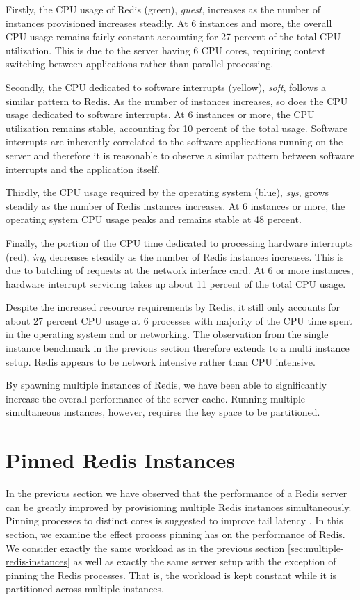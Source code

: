 Firstly, the CPU usage of Redis (green), \textit{guest}, increases as the number of instances provisioned increases steadily. At 6 instances and more, the overall CPU usage remains fairly constant accounting for 27 percent of the total CPU utilization. This is due to the server having 6 CPU cores, requiring context switching between applications rather than parallel processing.

Secondly, the CPU dedicated to software interrupts (yellow), \textit{soft}, follows a similar pattern to Redis. As the number of instances increases, so does the CPU usage dedicated to software interrupts. At 6 instances or more, the CPU utilization remains stable, accounting for 10 percent of the total usage. Software interrupts are inherently correlated to the software applications running on the server and therefore it is reasonable to observe a similar pattern between software interrupts and the application itself.

Thirdly, the CPU usage required by the operating system (blue), \textit{sys}, grows steadily as the number of Redis instances increases. At 6 instances or more, the operating system CPU usage peaks and remains stable at 48 percent.

Finally, the portion of the CPU time dedicated to processing hardware interrupts (red), \textit{irq}, decreases steadily as the number of Redis instances increases. This is due to batching of requests at the network interface card. At 6 or more instances, hardware interrupt servicing takes up about 11 percent of the total CPU usage.

Despite the increased resource requirements by Redis, it still only accounts for about 27 percent CPU usage at 6 processes with majority of the CPU time spent in the operating system and or networking. The observation from the single instance benchmark in the previous section therefore extends to a multi instance setup. Redis appears to be network intensive rather than CPU intensive.


By spawning multiple instances of Redis, we have been able to significantly increase the overall performance of the server cache. Running multiple simultaneous instances, however, requires the key space to be partitioned.


\section{Pinned Redis Instances}

In the previous section we have observed that the performance of a Redis server can be greatly improved by provisioning multiple Redis instances simultaneously. Pinning processes to distinct cores is suggested to improve tail latency \cite{leverich2014reconciling}. In this section, we examine the effect process pinning has on the performance of Redis. We consider exactly the same workload as in the previous section \ref{sec:multiple-redis-instances} as well as exactly the same server setup with the exception of pinning the Redis processes. That is, the workload is kept constant while it is partitioned across multiple instances.

